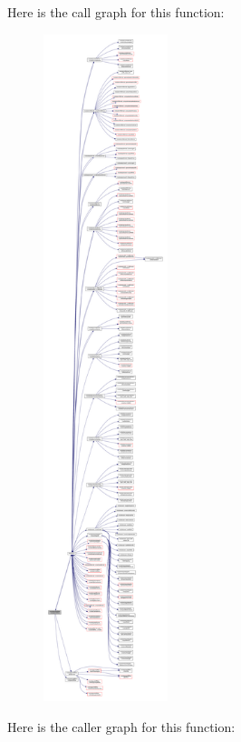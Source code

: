 Here is the call graph for this function\+:\nopagebreak
\begin{figure}[H]
\begin{center}
\leavevmode
\includegraphics[height=550pt]{namespacemodulegluehdf5files_ab2346fccf5401da3d9edc023aaadba24_cgraph}
\end{center}
\end{figure}
Here is the caller graph for this function\+:\nopagebreak
